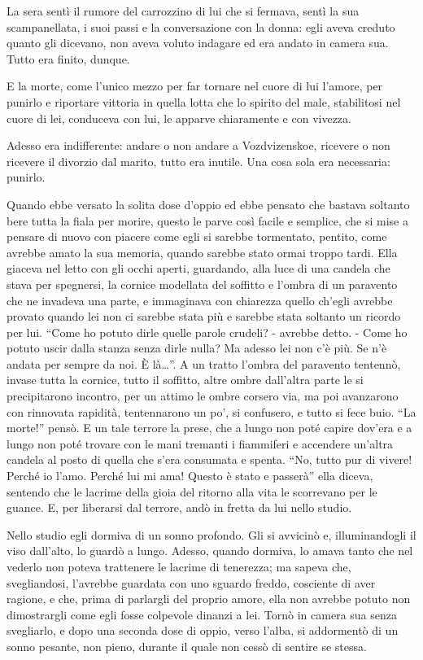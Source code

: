 La sera sentì il rumore del carrozzino di lui che si fermava, sentì la sua scampanellata, i suoi passi e la conversazione con la donna: egli aveva creduto quanto gli dicevano, non aveva voluto indagare ed era andato in camera sua. Tutto era finito, dunque. 

E la morte, come l'unico mezzo per far tornare nel cuore di lui l'amore, per punirlo e riportare vittoria in quella lotta che lo spirito del male, stabilitosi nel cuore di lei, conduceva con lui, le apparve chiaramente e con vivezza. 

Adesso era indifferente: andare o non andare a Vozdvizenskoe, ricevere o non ricevere il divorzio dal marito, tutto era inutile. Una cosa sola era necessaria: punirlo. 

Quando ebbe versato la solita dose d'oppio ed ebbe pensato che bastava soltanto bere tutta la fiala per morire, questo le parve così facile e semplice, che si mise a pensare di nuovo con piacere come egli si sarebbe tormentato, pentito, come avrebbe amato la sua memoria, quando sarebbe stato ormai troppo tardi. Ella giaceva nel letto con gli occhi aperti, guardando, alla luce di una candela che stava per spegnersi, la cornice modellata del soffitto e l'ombra di un paravento che ne invadeva una parte, e immaginava con chiarezza quello ch'egli avrebbe provato quando lei non ci sarebbe stata più e sarebbe stata soltanto un ricordo per lui. ``Come ho potuto dirle quelle parole crudeli? - avrebbe detto. - Come ho potuto uscir dalla stanza senza dirle nulla? Ma adesso lei non c'è più. Se n'è andata per sempre da noi. È là\ldots{}''. A un tratto l'ombra del paravento tentennò, invase tutta la cornice, tutto il soffitto, altre ombre dall'altra parte le si precipitarono incontro, per un attimo le ombre corsero via, ma poi avanzarono con rinnovata rapidità, tentennarono un po', si confusero, e tutto si fece buio. ``La morte!'' pensò. E un tale terrore la prese, che a lungo non poté capire dov'era e a lungo non poté trovare con le mani tremanti i fiammiferi e accendere un'altra candela al posto di quella che s'era consumata e spenta. ``No, tutto pur di vivere! Perché io l'amo. Perché lui mi ama! Questo è stato e passerà'' ella diceva, sentendo che le lacrime della gioia del ritorno alla vita le scorrevano per le guance. E, per liberarsi dal terrore, andò in fretta da lui nello studio. 

Nello studio egli dormiva di un sonno profondo. Gli si avvicinò e, illuminandogli il viso dall'alto, lo guardò a lungo. Adesso, quando dormiva, lo amava tanto che nel vederlo non poteva trattenere le lacrime di tenerezza; ma sapeva che, svegliandosi, l'avrebbe guardata con uno sguardo freddo, cosciente di aver ragione, e che, prima di parlargli del proprio amore, ella non avrebbe potuto non dimostrargli come egli fosse colpevole dinanzi a lei. Tornò in camera sua senza svegliarlo, e dopo una seconda dose di oppio, verso l'alba, si addormentò di un sonno pesante, non pieno, durante il quale non cessò di sentire se stessa. 

